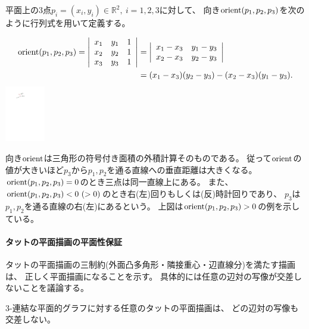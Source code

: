 平面上の$3$点$p_i=(x_i, y_i) \in \mathbb{R}^2,\ i=1, 2, 3$に対して、
向き$\operatorname{orient}(p_1, p_2, p_3)$を次のように行列式を用いて定義する。
\begin{paracol}{2}
\vspace{-1.5\intextsep}
\begin{align*}
\operatorname{orient}(p_1, p_2, p_3) =
    \left|
        \begin{array}{ccc}
            x_1 & y_1 & 1 \\
            x_2 & y_2 & 1 \\
            x_3 & y_3 & 1
    \end{array}
    \right| &=
    \left|
        \begin{array}{cc}
            x_1 - x_3 & y_1 - y_3 \\
            x_2 - x_3 & y_2 - y_3
        \end{array}
    \right| \\
&=(x_1 - x_3)(y_2 - y_3) - (x_2 - x_3)(y_1 - y_3).
\end{align*}
\switchcolumn
\centering
\includegraphics[width=0.13\textwidth]{figures/orientation.pdf}
\end{paracol}
向き$\operatorname{orient}$は三角形の符号付き面積の外積計算そのものである。
従って$\operatorname{orient}$の値が大きいほど$p_3$から$p_1, p_2$を通る直線への垂直距離は大きくなる。
$\operatorname{orient}(p_1, p_2, p_3) = 0$のとき三点は同一直線上にある。
また、$\operatorname{orient}(p_1, p_2, p_3) < 0~(> 0)$のとき右(左)回りもしくは(反)時計回りであり、
$p_3$は$p_1, p_2$を通る直線の右(左)にあるという。
上図は$\operatorname{orient}(p_1, p_2, p_3) > 0$の例を示している。





\paragraph{タットの平面描画の平面性保証}
タットの平面描画の三制約(外面凸多角形・隣接重心・辺直線分)を満たす描画は、
正しく平面描画になることを示す。
具体的には任意の辺対の写像が交差しないことを議論する。
\begin{theorem}[タットのばね定理]
\label{thm:tutte}
$3$-連結な平面的グラフに対する任意のタットの平面描画は、
どの辺対の写像も交差しない。
\end{theorem}




